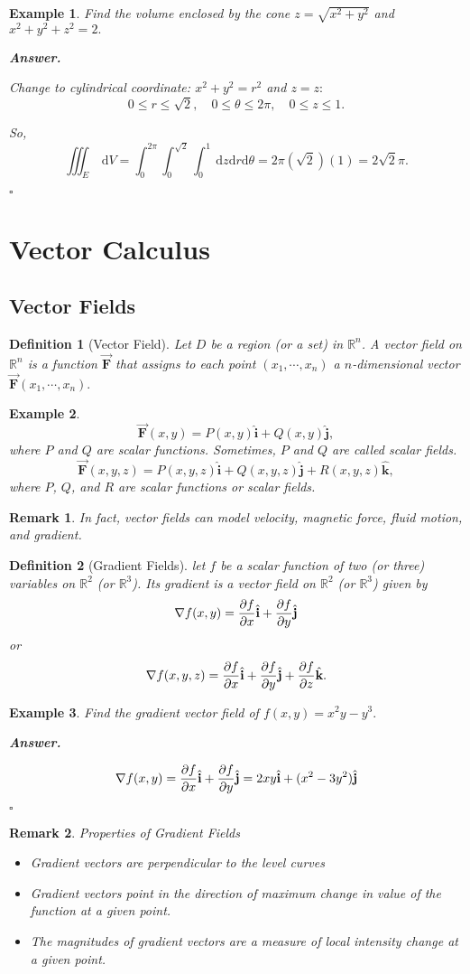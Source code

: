 \documentclass[12pt,a4paper]{article}
\newtheorem{df}{Definition}[subsection]
\newtheorem{eg}{Example}[subsection]
\newenvironment*{ans}{\par\indent\textbf{\textit{Answer. }}\par}{\par\hfill{$\square$}\par}
\newtheorem*{rmk}{\indent Remark}
\def\dsst{\displaystyle}
\def\R{{\mathbb{R}}}
\def\d{{\mathrm{d}}}
\def\dz{\d z}
\def\dV{\d V}
\def\iiintE{\dsst\iiint_E}
\def\veci{\hat{\boldsymbol{\textbf{i}}}}
\def\vecj{\hat{\boldsymbol{\textbf{j}}}}
\def\veck{\hat{\boldsymbol{\textbf{k}}}}
\def\F{\vec{\boldsymbol{\textbf{F}}}}
\begin{document}
\begin{eg}
	Find the volume enclosed by the cone $z=\sqrt{x^2+y^2}$ and $x^2+y^2+z^2=2.$
	\begin{ans}
		Change to cylindrical coordinate: $x^2+y^2=r^2$ and $z=z:$ \[0\leq r\leq\sqrt{2},\quad 0\leq\theta\leq2\pi,\quad 0\leq z\leq1.\]\par So, \[\iiintE\ \dV=\int_0^{2\pi}\int_0^{\sqrt{2}}\int_0^1\ \dz\d r\d\theta=2\pi(\sqrt{2})(1)=2\sqrt{2}\pi.\]
	\end{ans}
\end{eg}

\newpage
\section{Vector Calculus}
\subsection{Vector Fields}
\begin{df}[Vector Field]
	Let $D$ be a region (or a set) in $\R^n$. A vector field on $\R^n$ is a function $\F$ that assigns to each point $(x_1,\cdots,x_n)$ a $n$-dimensional vector $\F(x_1,\cdots,x_n).$	
\end{df}
\begin{eg}
	\[\F(x,y)=P(x,y)\veci+Q(x,y)\vecj,\] where $P$ and $Q$ are scalar functions. Sometimes, $P$ and $Q$ are called scalar fields. \[\F(x,y,z)=P(x,y,z)\veci+Q(x,y,z)\vecj+R(x,y,z)\veck,\] where $P$, $Q$, and $R$ are scalar functions or scalar fields.
\end{eg}
\begin{rmk}
	In fact, vector fields can model velocity, magnetic force, fluid motion, and gradient.	
\end{rmk}
\begin{df}[Gradient Fields]
	let $f$ be a scalar function of two (or three) variables on $\R^2$ (or $\R^3$). Its gradient is a vector field on $\R^2$ (or $\R^3$) given by \[\nabla f(x,y)=\pdv{f}{x}(x,y)\veci+\pdv{f}{y}\vecj\] or \[\nabla f(x,y,z)=\pdv{f}{x}(x,y,z)\veci+\pdv{f}{y}(x,y,z)\vecj+\pdv{f}{z}(x,y,z)\veck.\]	
\end{df}
\begin{eg}
	Find the gradient vector field of $f(x,y)=x^2y-y^3.$
	\begin{ans}
		\[\nabla f(x,y)=\pdv{f}{x}\veci+\pdv{f}{y}\vecj=2xy\veci+(x^2-3y^2)\vecj\]
	\end{ans}	
\end{eg}
\begin{rmk}
Properties of Gradient Fields
	\begin{itemize}
		\item Gradient vectors are perpendicular to the level curves
		\item Gradient vectors point in the direction of maximum change in value of the function at a given point.
		\item The magnitudes of gradient vectors are a measure of local intensity change at a given point.
	\end{itemize}
\end{rmk}
\end{document}
